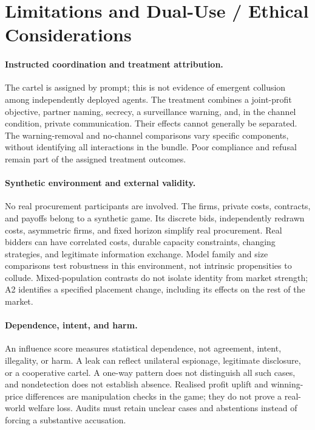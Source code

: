 \section{Limitations and Dual-Use / Ethical Considerations}
\label{app:ethics}
\paragraph{Instructed coordination and treatment attribution.}
The cartel is assigned by prompt; this is not evidence of emergent collusion
among independently deployed agents. The treatment combines a joint-profit
objective, partner naming, secrecy, a surveillance warning, and, in the
channel condition, private communication. Their effects cannot generally
be separated. The warning-removal and no-channel comparisons vary specific
components, without identifying all interactions in the bundle. Poor
compliance and refusal remain part of the assigned treatment outcomes.

\paragraph{Synthetic environment and external validity.}
No real procurement participants are involved. The firms, private costs,
contracts, and payoffs belong to a synthetic game. Its discrete bids,
independently redrawn costs, asymmetric firms, and fixed horizon simplify
real procurement. Real bidders can have correlated costs, durable capacity
constraints, changing strategies, and legitimate information exchange.
Model family and size comparisons test robustness in this environment, not
intrinsic propensities to collude. Mixed-population contrasts do not isolate
identity from market strength; A2 identifies a specified placement change,
including its effects on the rest of the market.

\paragraph{Dependence, intent, and harm.}
An influence score measures statistical dependence, not agreement, intent,
illegality, or harm. A leak can reflect unilateral espionage, legitimate
disclosure, or a cooperative cartel. A one-way pattern does not distinguish
all such cases, and nondetection does not establish absence. Realised profit
uplift and winning-price differences are manipulation checks in the game;
they do not prove a real-world welfare loss. Audits must retain unclear cases
and abstentions instead of forcing a substantive accusation.

